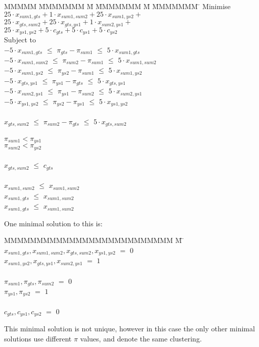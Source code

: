 \begin{tabbing}
MMMMM   \= MMMMMMM \= M \= MMMMMMM \= M \= MMMMMMM \= \kill
Minimise   \> $25 \cdot x_{sum1, gts} + 1 \cdot x_{sum1,sum2} + 25 \cdot x_{sum1, ys2} +$ \\
           \> $25 \cdot x_{gts, sum2} + 25 \cdot x_{gts, ys1} + 1 \cdot x_{sum2, ys1} +$ \\
           \> $ 25 \cdot x_{ys1, ys2} + 5 \cdot c_{gts} + 5 \cdot c_{ys1} + 5 \cdot c_{ys2} $\\
Subject to \\
    \> $-5 \cdot x_{sum1, gts}$  \> $\le$ \> $\pi_{gts} - \pi_{sum1}$  \> $\le$ \> $5 \cdot x_{sum1, gts}$  \\
    \> $-5 \cdot x_{sum1, sum2}$ \> $\le$ \> $\pi_{sum2} - \pi_{sum1}$ \> $\le$ \> $5 \cdot x_{sum1, sum2}$ \\
    \> $-5 \cdot x_{sum1, ys2 }$ \> $\le$ \> $\pi_{ys2 } - \pi_{sum1}$ \> $\le$ \> $5 \cdot x_{sum1, ys2 }$ \\
    \> $-5 \cdot x_{gts,  ys1 }$ \> $\le$ \> $\pi_{ys1 } - \pi_{gts }$ \> $\le$ \> $5 \cdot x_{gts, ys1  }$ \\
    \> $-5 \cdot x_{sum2, ys1 }$ \> $\le$ \> $\pi_{ys1 } - \pi_{sum2}$ \> $\le$ \> $5 \cdot x_{sum2, ys1 }$ \\
    \> $-5 \cdot x_{ys1, ys2  }$ \> $\le$ \> $\pi_{ys2 } - \pi_{ys1 }$ \> $\le$ \> $5 \cdot x_{ys1, ys2  }$ \\
\\
    \> $   x_{gts, sum2 }$ \> $\le$ \> $\pi_{sum2} - \pi_{gts }$ \> $\le$ \> $5 \cdot x_{gts, sum2 }$ \\
\\
    \>                     \>       \> $\pi_{sum1} < \pi_{ys1}$ \\
    \>                     \>       \> $\pi_{sum2} < \pi_{ys2}$ \\
\\
    \> $ x_{gts,sum2} $    \> $\le$ \> $c_{gts}$ \\
\\
    \> $x_{sum1,sum2}$     \> $\le$ \> $x_{sum1, sum2}$ \\
    \> $x_{sum1, gts}$     \> $\le$ \> $x_{sum1, sum2}$ \\
    \> $x_{sum1, gts}$     \> $\le$ \> $x_{sum1, sum2}$
\end{tabbing}

One minimal solution to this is:
\begin{tabbing}
MMMMMMMMMMMMMMMMMMMMMMMMMM \= M \= \kill
$x_{sum1, gts}, x_{sum1, sum2}, x_{gts, sum2}, x_{ys1,  ys2}$
    \> $=$ \> $0$ \\
$x_{sum1, ys2}, x_{gts, ys1 }, x_{sum2, ys1}$
    \> $=$ \> $1$ \\
\\
$\pi_{sum1}, \pi_{gts }, \pi_{sum2}$
    \> $=$ \> $0$ \\
$\pi_{ys1 }, \pi_{ys2 }$
    \> $=$ \> $1$ \\
\\
$c_{gts}, c_{ys1}, c_{ys2}$           
    \> $=$ \> $0$
\end{tabbing}
This minimal solution is not unique, however in this case the only other minimal solutions use different $\pi$ values, and denote the same clustering.

